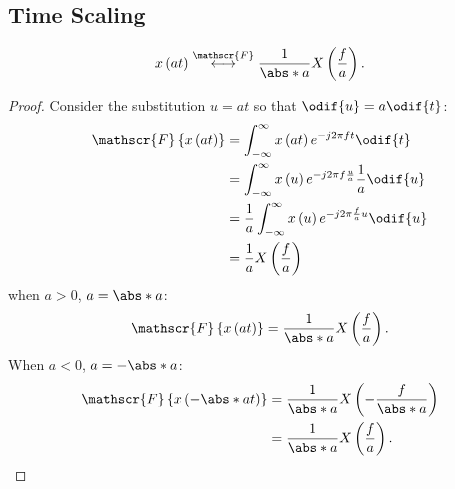 \documentclass{article}
\begin{document}
\subsection{Time Scaling}
\begin{equation*}
    x\left( at \right) \overset{\mathscr{F}}{\longleftrightarrow} \frac{1}{\abs*{a}} X\left( \frac{f}{a} \right).
\end{equation*}
\begin{proof}
    Consider the substitution \(u = at\) so that \(\odif{u} = a \odif{t}\):
    \begin{align*}
        \mathscr{F}\left\{ x\left( at \right) \right\} & = \int_{-\infty}^\infty x\left( at \right) e^{-j 2\pi f t} \odif{t}                      \\
                                                       & = \int_{-\infty}^\infty x\left( u \right) e^{-j 2\pi f \frac{u}{a}} \frac{1}{a} \odif{u} \\
                                                       & = \frac{1}{a} \int_{-\infty}^\infty x\left( u \right) e^{-j 2\pi \frac{f}{a} u} \odif{u} \\
                                                       & = \frac{1}{a} X\left( \frac{f}{a} \right)
    \end{align*}
    when \(a > 0\), \(a = \abs*{a}\):
    \begin{equation*}
        \mathscr{F}\left\{ x\left( at \right) \right\} = \frac{1}{\abs*{a}} X\left( \frac{f}{a} \right).
    \end{equation*}
    When \(a < 0\), \(a = -\abs*{a}\):
    \begin{align*}
        \mathscr{F}\left\{ x\left( -\abs*{a} t \right) \right\} & = \frac{1}{\abs*{a}} X\left( -\frac{f}{\abs*{a}} \right) \\
                                                                & = \frac{1}{\abs*{a}} X\left( \frac{f}{a} \right).
    \end{align*}
\end{proof}
\end{document}
